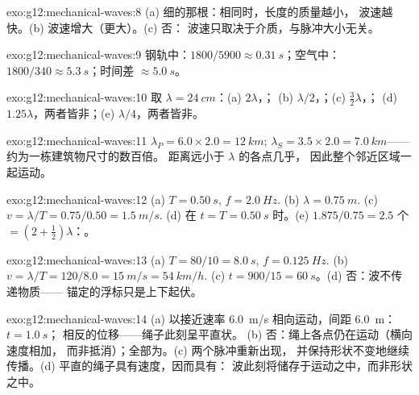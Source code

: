 \begin{solution}{exo:g12:mechanical-waves:8}
(a) 细的那根：相同时，长度的质量越小，
波速越快。(b) 波速增大（更大）。(c) 否：
波速只取决于介质，与脉冲大小无关。
\end{solution}

\begin{solution}{exo:g12:mechanical-waves:9}
钢轨中：$1800/5900 \approx \qty{0.31}{s}$；空气中：
$1800/340 \approx \qty{5.3}{s}$；时间差 $\approx \qty{5.0}{s}$。
\end{solution}

\begin{solution}{exo:g12:mechanical-waves:10}
取 $\lambda = \qty{24}{cm}$：(a) $2\lambda$，；
(b) $\lambda/2$，；(c) $\tfrac32\lambda$，；
(d) $1.25\lambda$，两者皆非；(e) $\lambda/4$，两者皆非。
\end{solution}

\begin{solution}{exo:g12:mechanical-waves:11}
$\lambda_P = 6.0 \times 2.0 = \qty{12}{km}$;
$\lambda_S = 3.5 \times 2.0 = \qty{7.0}{km}$——约为一栋建筑物尺寸的数百倍。
距离远小于 $\lambda$ 的各点几乎，
因此整个邻近区域一起运动。
\end{solution}

\begin{solution}{exo:g12:mechanical-waves:12}
(a) $T = \qty{0.50}{s}$, $f = \qty{2.0}{Hz}$.
(b) $\lambda = \qty{0.75}{m}$.
(c) $v = \lambda/T = 0.75/0.50 = \qty{1.5}{m/s}$.
(d) 在 $t = T = \qty{0.50}{s}$ 时。(e) $1.875/0.75 = 2.5$ 个
 $= (2 + \tfrac12)\lambda$：。
\end{solution}

\begin{solution}{exo:g12:mechanical-waves:13}
(a) $T = 80/10 = \qty{8.0}{s}$, $f = \qty{0.125}{Hz}$.
(b) $v = \lambda/T = 120/8.0 = \qty{15}{m/s} = \qty{54}{km/h}$.
(c) $t = 900/15 = \qty{60}{s}$。(d) 否：波不传递物质——
锚定的浮标只是上下起伏。
\end{solution}

\begin{solution}{exo:g12:mechanical-waves:14}
(a) 以接近速率 \qty{6.0}{m/s} 相向运动，间距 \qty{6.0}{m}：$t = \qty{1.0}{s}$；
相反的位移——绳子此刻呈平直状。
(b) 否：绳上各点仍在运动（横向速度相加，
而非抵消）；全部为。(c) 两个脉冲重新出现，
并保持形状不变地继续传播。(d) 平直的绳子具有速度，因而具有：
波此刻将储存于运动之中，而非形状之中。
\end{solution}


